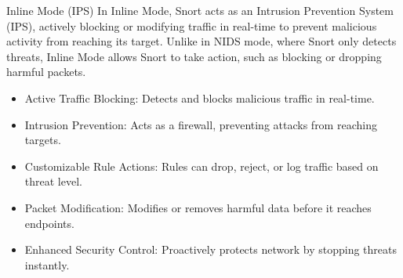\begin{frame}[t]{Inline Mode (IPS)}
  \fontsize{11}{13.5}\selectfont
  In Inline Mode, Snort acts as an Intrusion Prevention System (IPS), actively blocking or modifying traffic in real-time to prevent malicious activity from reaching its target. Unlike in NIDS mode, where Snort only detects threats, Inline Mode allows Snort to take action, such as blocking or dropping harmful packets.
  \vspace{0.06cm}
  \begin{itemize}
    \item \textcolor{WarningColor}{Active Traffic Blocking:} Detects and blocks malicious traffic in real-time.
    \item \textcolor{WarningColor}{Intrusion Prevention:} Acts as a firewall, preventing attacks from reaching targets.
    \item \textcolor{WarningColor}{Customizable Rule Actions:} Rules can drop, reject, or log traffic based on threat level.
    \item \textcolor{WarningColor}{Packet Modification:} Modifies or removes harmful data before it reaches endpoints.
    \item \textcolor{WarningColor}{Enhanced Security Control:} Proactively protects network by stopping threats instantly.
  \end{itemize}
\end{frame}
